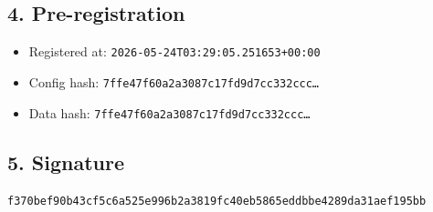 \documentclass{article}
\begin{document}
\subsection*{4. Pre-registration}
\begin{itemize}
\item Registered at: \texttt{2026-05-24T03:29:05.251653+00:00}
\item Config hash: \texttt{7ffe47f60a2a3087c17fd9d7cc332ccc\dots}
\item Data hash: \texttt{7ffe47f60a2a3087c17fd9d7cc332ccc\dots}
\end{itemize}
\subsection*{5. Signature}
\texttt{f370bef90b43cf5c6a525e996b2a3819fc40eb5865eddbbe4289da31aef195bb}\\
\end{document}
